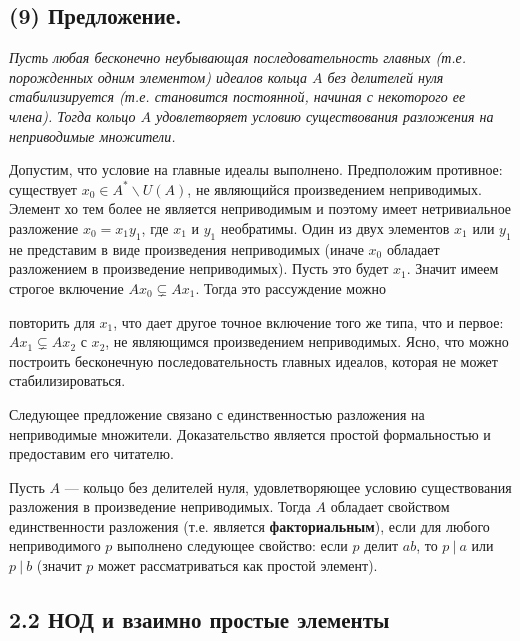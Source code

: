 \subsection{(9) Предложение.}
\textit{\indent Пусть любая бесконечно неубывающая последовательность главных (т.е. порожденных одним элементом) идеалов кольца $A$ без делителей нуля стабилизируется (т.е. становится постоянной, начиная с некоторого ее члена). Тогда кольцо $A$ удовлетворяет условию существования разложения на неприводимые множители.}

\begin{myproof}
Допустим, что условие на главные идеалы выполнено. Предположим противное: существует $x_0 \in A^* \backslash U(A)$, не являющийся произведением неприводимых. Элемент хо тем более не является неприводимым и поэтому имеет нетривиальное разложение $x_0 = x_1 y_1$, где $x_1$ и $y_1$ необратимы. Один из двух элементов $x_1$ или $y_1$ не представим в виде произведения неприводимых (иначе $x_0$ обладает разложением в произведение неприводимых). Пусть это будет $x_1$. Значит имеем строгое включение $A x_0 \varsubsetneq A x_1$. Тогда это рассуждение можно

\newpage
\noindent повторить для $x_1$, что дает другое точное включение того же типа, что и первое: $A x_1 \varsubsetneq A x_2$ с $x_2$, не являющимся произведением неприводимых. Ясно, что можно построить бесконечную последовательность главных идеалов, которая не может стабилизироваться.
\end{myproof}

Следующее предложение связано с единственностью разложения на неприводимые множители. Доказательство является простой формальностью и предоставим его читателю.

\begin{predl}
\textit{\indent} Пусть $A$ — кольцо без делителей нуля, удовлетворяющее условию существования разложения в произведение неприводимых. Тогда $A$ обладает свойством единственности разложения (т.е. является \textbf{факториальным}), если для любого неприводимого $p$ выполнено следующее свойство: если $p$ делит $ab$, то $p\:|\:a$ или $p\:|\:b$ (значит $p$ может рассматриваться как простой элемент).
\end{predl}

\subsection{\large 2.2 НОД и взаимно простые элементы}

